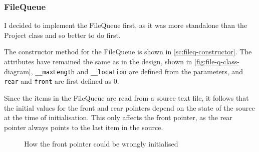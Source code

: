 \documentclass[11pt]{article}
\begin{document}
                
        \subsubsection{FileQueue}
            I decided to implement the FileQueue first, as it was more standalone than the Project class and so better to do first. 

            \vspace{10pt}
            The constructor method for the FileQueue is shown in \autoref{sc:fileq-constructor}. The attributes have remained the same as in the design, shown in \autoref{fig:file-q-class-diagram}, \verb|__maxLength| and \verb|__location| are defined from the parameters, and \verb|rear| and \verb|front| are first defined as 0. 

            Since the items in the FileQueue are read from a source text file, it follows that the initial values for the front and rear pointers depend on the state of the source at the time of initialisation. This only affects the front pointer, as the rear pointer always points to the last item in the source. 

            \begin{figure}[!h]
                \centering
                \caption{How the front pointer could be wrongly initialised}
                \label{flow:fileq-front-ptr-init-bad}
            \end{figure}
\end{document}
